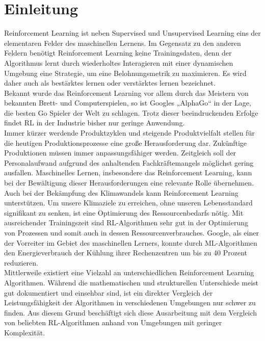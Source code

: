 \section{Einleitung}
Reinforcement Learning ist neben Supervised und Unsupervised Learning eins der elementaren Felder des maschinellen Lernens. 
Im Gegensatz zu den anderen Feldern benötigt Reinforcement Learning keine Trainingsdaten, 
denn der Algorithmus lernt durch wiederholtes Interagieren mit einer dynamischen Umgebung eine Strategie, 
um eine Belohnungsmetrik zu maximieren. Es wird daher auch als bestärktes lernen oder verstärktes lernen bezeichnet.\\

Bekannt wurde das Reinforcement Learning vor allem durch das Meistern von bekannten Brett- und Computerspielen, 
so ist Googles „AlphaGo“ in der Lage, die besten Go Spieler der Welt zu schlagen. 
Trotz dieser beeindruckenden Erfolge findet RL in der Industrie bisher nur geringe Anwendung.\\  

Immer kürzer werdende Produktzyklen und steigende Produktvielfalt stellen für die heutigen Produktionsprozesse eine große Herausforderung dar.
Zukünftige Produktionen müssen immer anpassungsfähiger werden. 
Zeitgleich soll der Personalaufwand aufgrund des anhaltenden Fachkräftemangels möglichst gering ausfallen. 
Maschinelles Lernen, insbesondere das Reinforcement Learning,
kann bei der Bewältigung dieser Herausforderungen eine relevante Rolle übernehmen.\\

Auch bei der Bekämpfung des Klimawandels kann Reinforcement Learning unterstützen. 
Um unsere Klimaziele zu erreichen, ohne unseren Lebensstandard signifikant zu senken, 
ist eine Optimierung des Ressourcenbedarfs nötig. 
Mit ausreichender Trainingszeit sind RL-Algorithmen sehr gut in der Optimierung von Prozessen und 
somit auch in dessen Ressourcenverbrauches. Google, als einer der Vorreiter im Gebiet des maschinellen Lerners, 
konnte durch ML-Algorithmen den Energieverbrauch der Kühlung ihrer Rechenzentren um bis zu 40 Prozent reduzieren.\\

Mittlerweile existiert eine Vielzahl an unterschiedlichen Reinforcement Learning Algorithmen. 
Während die mathematischen und strukturellen Unterschiede meist gut dokumentiert und einsehbar sind, 
ist ein direkter Vergleich der Leistungsfähigkeit der Algorithmen in verschiedenen Umgebungen nur schwer zu finden. 
Aus diesem Grund beschäftigt sich diese Ausarbeitung mit dem Vergleich von beliebten RL-Algorithmen anhand von Umgebungen mit geringer Komplexität.\\

